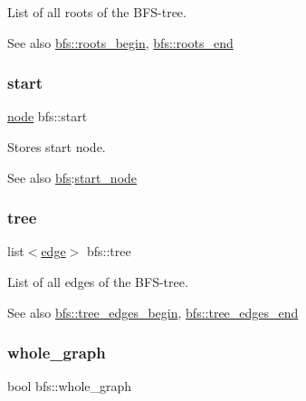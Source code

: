 List of all roots of the B\+F\+S-\/tree. 

\begin{DoxySeeAlso}{See also}
\mbox{\hyperlink{classbfs_a45d58d06d0dcd6427edad2ec52a6ebb9}{bfs\+::roots\+\_\+begin}}, \mbox{\hyperlink{classbfs_ac84b90f777adeb90390689db62602d73}{bfs\+::roots\+\_\+end}} 
\end{DoxySeeAlso}
\mbox{\label{classbfs_af2ab561d9e60a9fc2e25b02d1f807f96}} 
\subsubsection{\texorpdfstring{start}{start}}
{\footnotesize\ttfamily \mbox{\hyperlink{classnode}{node}} bfs\+::start\hspace{0.3cm}{\ttfamily [protected]}}



Stores start node. 

\begin{DoxySeeAlso}{See also}
\mbox{\hyperlink{classbfs}{bfs}}\+:\mbox{\hyperlink{classbfs_a23e2981c2ee617a6e12a8833d2db6210}{start\+\_\+node}} 
\end{DoxySeeAlso}
\mbox{\label{classbfs_aa259f09ada9928cda41bcb540f685e80}} 
\subsubsection{\texorpdfstring{tree}{tree}}
{\footnotesize\ttfamily list$<$\mbox{\hyperlink{classedge}{edge}}$>$ bfs\+::tree\hspace{0.3cm}{\ttfamily [protected]}}



List of all edges of the B\+F\+S-\/tree. 

\begin{DoxySeeAlso}{See also}
\mbox{\hyperlink{classbfs_a56959215efdfee1a37826ad315ac13e7}{bfs\+::tree\+\_\+edges\+\_\+begin}}, \mbox{\hyperlink{classbfs_a7db47d5d68e21e95fd548beea1a8db2b}{bfs\+::tree\+\_\+edges\+\_\+end}} 
\end{DoxySeeAlso}
\mbox{\label{classbfs_a6c08fbcc90d71f1cbdd03a1cdaa9dc99}} 
\subsubsection{\texorpdfstring{whole\+\_\+graph}{whole\_graph}}
{\footnotesize\ttfamily bool bfs\+::whole\+\_\+graph\hspace{0.3cm}{\ttfamily [protected]}}



